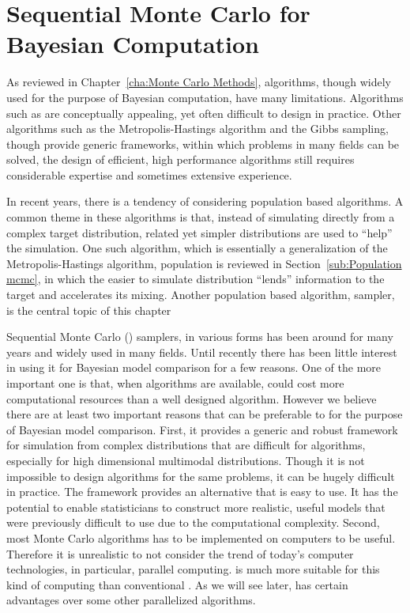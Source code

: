 \chapter{Sequential Monte Carlo for Bayesian Computation}
\label{cha:Sequential Monte Carlo for Bayesian Computation}

As reviewed in Chapter~\ref{cha:Monte Carlo Methods}, \mcmc algorithms, though widely used for the purpose of Bayesian computation, have many limitations. Algorithms such as \rjmcmc are conceptually appealing, yet often difficult to design in practice. Other algorithms such as the Metropolis-Hastings algorithm and the Gibbs sampling, though provide generic frameworks, within which problems in many fields can be solved, the design of efficient, high performance algorithms still requires considerable expertise and sometimes extensive experience.

In recent years, there is a tendency of considering population based algorithms. A common theme in these algorithms is that, instead of simulating directly from a complex target distribution, related yet simpler distributions are used to ``help'' the simulation. One such algorithm, which is essentially a generalization of the Metropolis-Hastings algorithm, population \mcmc is reviewed in Section~\ref{sub:Population mcmc}, in which the easier to simulate distribution ``lends'' information to the target and accelerates its mixing. Another population based algorithm, \smc sampler, is the central topic of this chapter

Sequential Monte Carlo (\smc) samplers, in various forms has been around for many years and widely used in many fields. Until recently there has been little interest in using it for Bayesian model comparison for a few reasons. One of the more important one is that, when \mcmc algorithms are available, \smc could cost more computational resources than a well designed \mcmc algorithm. However we believe there are at least two important reasons that \smc can be preferable to \mcmc for the purpose of Bayesian model comparison. First, it provides a generic and robust framework for simulation from complex distributions that are difficult for \mcmc algorithms, especially for high dimensional multimodal distributions. Though it is not impossible to design \mcmc algorithms for the same problems, it can be hugely difficult in practice. The \smc framework provides an alternative that is easy to use. It has the potential to enable statisticians to construct more realistic, useful models that were previously difficult to use due to the computational complexity. Second, most Monte Carlo algorithms has to be implemented on computers to be useful. Therefore it is unrealistic to not consider the trend of today's computer technologies, in particular, parallel computing. \smc is much more suitable for this kind of computing than conventional \mcmc. As we will see later, \smc has certain advantages over some other parallelized algorithms.

